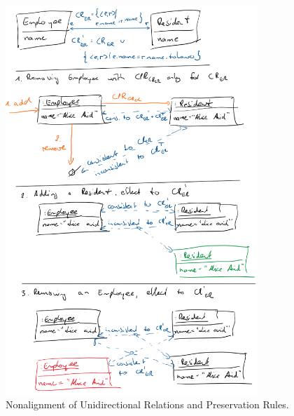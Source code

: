\begin{figure}
    \centering
    \includegraphics[width=0.85\textwidth]{figures/correctness/synchronization/unidirectional_nonalignment.png}
    \caption[Nonalignment of Unidirectional Relations and Preservation]{Nonalignment of Unidirectional Relations and Preservation Rules. %
    }
    \label{fig:synchronization:unidirectional_nonalignment}
\end{figure}

